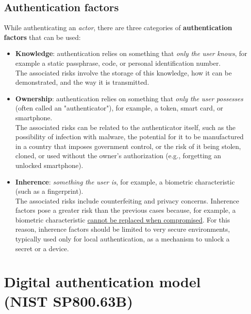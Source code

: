 \subsection*{Authentication factors}
While authenticating an \emph{actor}, there are three categories of \textbf{authentication factors} that can be used:
\begin{itemize}
  \item \textbf{Knowledge}: authentication relies on something that \emph{only the user knows}, for example a static
        passphrase, code, or personal identification number.\\
        The associated risks involve the storage of this
        knowledge, how it can be demonstrated, and the way it is transmitted.
  \item \textbf{Ownership}: authentication relies on something that \emph{only the user possesses} (often called an
        "authenticator"), for example, a token, smart card, or smartphone.\\
        The associated risks can be related
        to the authenticator itself, such as the possibility of infection with malware, the potential for it to be
        manufactured in a country that imposes government control, or the risk of it being stolen, cloned, or
        used without the owner's authorization (e.g., forgetting an unlocked smartphone).
  \item \textbf{Inherence}: \emph{something the user is}, for example, a biometric characteristic (such as a fingerprint).\\
        The associated risks include counterfeiting and privacy concerns. Inherence factors pose a greater risk
        than the previous cases because, for example, a biometric characteristic \ul{cannot be
          replaced when compromised}. For this reason, inherence factors should be limited to very secure environments,
        typically used only for local authentication, as a mechanism to unlock a secret or a device.
\end{itemize}


\section{Digital authentication model (NIST SP800.63B)}\label{chap:digital-auth-model}


